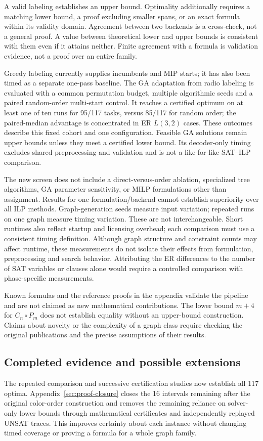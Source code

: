 A valid labeling establishes an upper bound. Optimality additionally requires
a matching lower bound, a proof excluding smaller spans, or an exact formula
within its validity domain. Agreement between two backends is a cross-check,
not a general proof. A value between theoretical lower and upper bounds is
consistent with them even if it attains neither. Finite agreement with a
formula is validation evidence, not a proof over an entire family.

Greedy labeling currently supplies incumbents and MIP starts; it has also
been timed as a separate one-pass baseline. The GA adaptation from radio
labeling \cite{sarhan2026genetic} is evaluated with a common permutation
budget, multiple algorithmic seeds and a paired random-order multi-start
control. It reaches a certified optimum on at least one of ten runs for
95/117 tasks, versus 85/117 for random order; the paired-median advantage is
concentrated in ER $L(3,2)$ cases. These outcomes describe this fixed cohort
and one configuration. Feasible GA solutions remain upper bounds unless they
meet a certified lower bound. Its decoder-only timing excludes shared
preprocessing and validation and is not a like-for-like SAT--ILP comparison.

The new screen does not include a direct-versus-order ablation, specialized
tree algorithms, GA parameter sensitivity, or MILP formulations other than assignment. Results for
one formulation/backend cannot establish superiority over all ILP methods.
Graph-generation seeds measure input variation; repeated runs on one graph
measure timing variation. These are not interchangeable. Short runtimes
also reflect startup and licensing overhead; each comparison must use a
consistent timing definition. Although graph structure and constraint
counts may affect runtime, these measurements do not isolate their
effects from formulation, preprocessing and search behavior. Attributing
the ER differences to the number of SAT variables or clauses alone
would require a controlled comparison with phase-specific measurements.

Known formulas and the reference proofs in the appendix validate the
pipeline and are not claimed as new mathematical contributions. The lower
bound $m+4$ for $C_n\circ P_m$ does not establish equality without an upper-bound
construction. Claims about novelty or the complexity of a graph class require
checking the original publications and the precise assumptions of their results.

\subsection{Completed evidence and possible extensions}
The repeated comparison and successive certification studies now establish
all 117 optima. Appendix~\ref{sec:proof-closure} closes the 16 intervals
remaining after the original color-order construction and removes the
remaining reliance on solver-only lower bounds through mathematical
certificates and independently replayed UNSAT traces. This improves
certainty about each instance without changing timed coverage or proving
a formula for a whole graph family.

